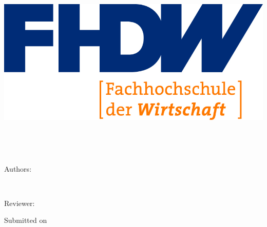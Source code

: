 
\begin{titlepage}

\begin{center}


\includegraphics[scale=1.20]{img/fhdw}\\

\vspace{.7cm}

\Huge{\bfseries\dokumententyp}

~\vspace{.5cm}\\

\LARGE{\dokumententitel}

~\vspace{1.3cm}\\


\large{

Authors:\\\vspace{1mm}

\dokumentenautor\\


\vspace{1.5cm}

Reviewer:\vspace{1mm}\\

\dokumentenpruefer


\vspace{1.5cm}

Submitted on \vspace{1mm}\\

\abgabedatum

}

\end{center}


\end{titlepage}

